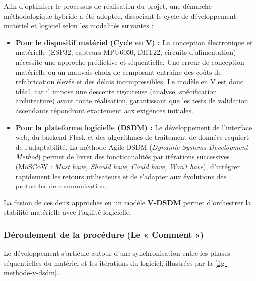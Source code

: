 Afin d'optimiser le processus de réalisation du projet, une démarche méthodologique hybride a été adoptée, dissociant le cycle de développement matériel et logiciel selon les modalités suivantes :
\begin{itemize}
    \item \textbf{Pour le dispositif matériel (Cycle en V) :} La conception électronique et matérielle (ESP32, capteurs MPU6050, DHT22, circuits d'alimentation) nécessite une approche prédictive et séquentielle. Une erreur de conception matérielle ou un mauvais choix de composant entraîne des coûts de refabrication élevés et des délais incompressibles. Le modèle en V est donc idéal, car il impose une descente rigoureuse (analyse, spécification, architecture) avant toute réalisation, garantissant que les tests de validation ascendants répondront exactement aux exigences initiales.
    \item \textbf{Pour la plateforme logicielle (DSDM) :} Le développement de l'interface web, du backend Flask et des algorithmes de traitement de données requiert de l'adaptabilité. La méthode Agile DSDM (\emph{Dynamic Systems Development Method}) permet de livrer des fonctionnalités par itérations successives (MoSCoW : \emph{Must have, Should have, Could have, Won't have}), d'intégrer rapidement les retours utilisateurs et de s'adapter aux évolutions des protocoles de communication.
\end{itemize}
La fusion de ces deux approches en un modèle \textbf{V-DSDM} permet d'orchestrer la stabilité matérielle avec l'agilité logicielle.

\subsubsection{Déroulement de la procédure (Le « Comment »)}

Le développement s'articule autour d'une synchronisation entre les phases séquentielles du matériel et les itérations du logiciel, illustrées par la \cref{fig-methode-v-dsdm}.

